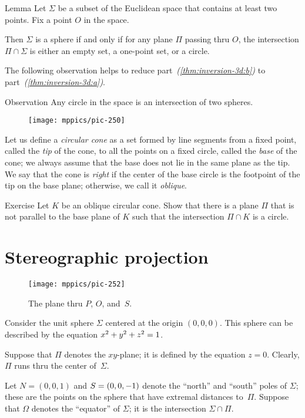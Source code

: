 \begin{thm}{Lemma}
Let $\Sigma$ be a subset of the Euclidean space
that contains at least two points.
Fix a point $O$ in the space.

Then $\Sigma$ is 
a sphere 
if and only if
for any plane $\Pi$ passing thru $O$,
the intersection $\Pi\cap \Sigma$ is either an empty set,
a one-point set, or a circle.
\end{thm}  

The following observation helps to reduce part~\textit{(\ref{thm:inversion-3d:b})} to part~\textit{(\ref{thm:inversion-3d:a})}.

\begin{thm}{Observation}
Any circle in the space is an intersection of two spheres.
\end{thm}

{

\begin{wrapfigure}{o}{25mm}
\centering
\texttt{[image: mppics/pic-250]}
\end{wrapfigure}

Let us define a \emph{circular cone} as a set formed by line segments from a fixed point, called the \emph{tip} of the cone, to all the points on a fixed circle, called the \emph{base} of the cone;
we always assume that the base does not lie in the same plane as the tip.
We say that the cone is \emph{right} 
if the center of the base circle is the footpoint of the tip on the base plane;
otherwise, we call it \emph{oblique}.

}

\begin{thm}{Exercise}\label{ex:cone}
Let $K$ be an oblique circular cone. Show that there is a plane $\Pi$ that is not parallel to the base plane of $K$ such that the intersection $\Pi\cap K$ is a circle.
\end{thm}


\section{Stereographic projection}

{

\begin{wrapfigure}{r}{48mm}
\vskip-10mm
\centering
\texttt{[image: mppics/pic-252]}
\caption*{The plane thru $P$, $O$, and~$S$.}
\end{wrapfigure}

Consider the unit sphere $\Sigma$ 
centered at the origin $(0,0,0)$.
This sphere can be described by the equation $x^2+y^2+z^2\z=1$. 

Suppose that $\Pi$ denotes the $xy$-plane;
it is defined by the equation $z = 0$.
Clearly, $\Pi$
runs thru the center of~$\Sigma$.

Let $N = (0, 0, 1)$ and $S\z=(0, 0, -1)$ denote the ``north'' and ``south'' poles of $\Sigma$;
these are the points on the sphere that have extremal distances to~$\Pi$.
Suppose that $\Omega$ denotes the ``equator'' of $\Sigma$;
it is the intersection $\Sigma\cap\Pi$.

}

